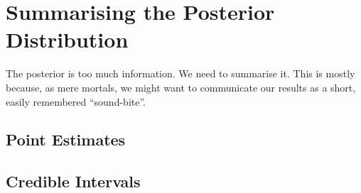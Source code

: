 \section{Summarising the Posterior Distribution}
The posterior is too much information. We need to summarise it. This is mostly
because, as mere mortals, we might want to communicate our results as a short,
easily remembered ``sound-bite''.


\subsection{Point Estimates}


\subsection{Credible Intervals}



